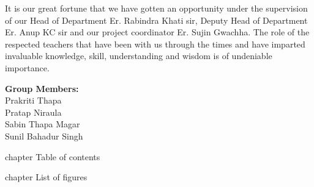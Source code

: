 \documentclass[12pt,a4paper]{report}
\begin{document}
	\begin{justify}
		It is our great fortune that we have gotten an opportunity under the supervision of our Head of Department Er. Rabindra Khati sir, Deputy Head of Department Er. Anup KC sir and our project coordinator Er. Sujin Gwachha. The role of the respected teachers that have been with us through the times and have imparted invaluable knowledge, skill, understanding and wisdom is of undeniable importance.
		
		
	\end{justify}
	
	
	
	
	\begin{FlushLeft}
		\textbf{Group Members:}	 \\
		Prakriti Thapa \\
		Pratap Niraula \\
		Sabin Thapa Magar \\
		Sunil Bahadur Singh 
	\end{FlushLeft}
	
	
	\pagebreak
	\thispagestyle{empty}
	 {chapter} {Table of contents}
	
	
	\begin{center}
		
		
		\setlength{\cftbeforetoctitleskip}{-13pt}
		
		\renewcommand{\contentsname}{\fontsize{16pt}{1.5pt}\selectfont\bfseries\textbf{TABLE OF CONTENTS} \fontfamily{times}}
		\setlength{\cftaftertoctitleskip}{2pt}
		\tableofcontents
	\end{center}
	
	
	
	
	
	
	\pagebreak
	
	
	
	 {chapter} {List of figures}
	\thispagestyle{plain}
	
	
	
	
	
\end{document}

